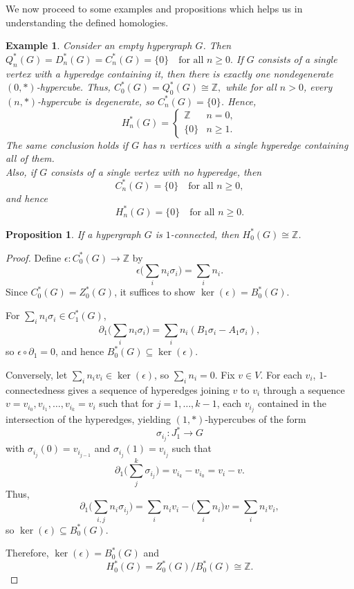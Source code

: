 \documentclass[11pt]{amsart}
\newtheorem{ex}[subsection]{Example}
\newtheorem{prop}[subsection]{Proposition}
\begin{document}
We now proceed to some examples and propositions which helps us in understanding the defined homologies.


\begin{ex}\label{eg single point hom} Consider an empty hypergraph $G$. Then 
$
Q_n^*(G)=D_n^*(G)=C_n^*(G)=\{0\} \quad \text{for all } n \geq 0.
$
If $G$ consists of a single vertex with a hyperedge containing it, then there is exactly one nondegenerate $(0,*)$-hypercube. Thus,
$
C_0^*(G)=Q_0^*(G)\cong \mathbb{Z},
$
while for all $n>0$, every $(n,*)$-hypercube is degenerate, so $C_n^*(G)=\{0\}$. Hence,
\[
H_n^*(G)=
\begin{cases}
\mathbb{Z} & n=0,\\
\{0\} & n \geq 1.
\end{cases}
\]
The same conclusion holds if $G$ has $n$ vertices with a single hyperedge containing all of them.
\\
Also, if $G$ consists of a single vertex with no hyperedge, then 
\[
C_n^*(G)=\{0\} \quad \text{for all } n \geq 0,
\]
and hence 
\[
H_n^*(G)=\{0\} \quad \text{for all } n \geq 0.
\]
\end{ex}


\begin{prop}\label{prop 1-connected}
	If a hypergraph $G$ is $1$-connected, then $H_0^*(G)\cong \mathbb{Z}$.
\end{prop}

\begin{proof}
Define $\epsilon:C_0^*(G)\to \mathbb{Z}$ by
\[
\epsilon\Big(\sum_i n_i \sigma_i\Big)=\sum_i n_i.
\]
Since $C_0^*(G)=Z_0^*(G)$, it suffices to show $\ker(\epsilon)=B_0^*(G)$.

For $\sum_i n_i \sigma_i \in C_1^*(G)$,
\[
\partial_1\Big(\sum_i n_i \sigma_i\Big)
= \sum_i n_i (B_1\sigma_i - A_1\sigma_i),
\]
so $\epsilon\circ \partial_1=0$, and hence $B_0^*(G)\subseteq \ker(\epsilon)$.

Conversely, let $\sum_i n_i v_i \in \ker(\epsilon)$, so $\sum_i n_i=0$. Fix $v\in V$. For each $v_i$, $1$-connectedness gives a sequence of hyperedges joining $v$ to $v_i$ through a sequence $v=v_{i_0},v_{i_1},\ldots,v_{i_k}=v_i$ such that for $j=1,\ldots,k-1$, each $v_{i_j}$ contained in the intersection of the hyperedges, yielding $(1,*)$-hypercubes of the form \[\sigma_{i_j}:J_1^*\to G\] with $\sigma_{i_j}(0)=v_{i_{j-1}}$ and $\sigma_{i_j}(1)=v_{i_j}$ such that 
\[
\partial_1\Big(\sum_j^k\sigma_{i_j}\Big)=v_{i_k} - v_{i_0}=v_i-v.
\]
Thus,
\[
\partial_1\Big(\sum_{i,j} n_i \sigma_{i_j}\Big)
= \sum_i n_i v_i - \Big(\sum_i n_i\Big)v
= \sum_i n_i v_i,
\]
so $\ker(\epsilon)\subseteq B_0^*(G)$.

Therefore, $\ker(\epsilon)=B_0^*(G)$ and
\[
H_0^*(G)=Z_0^*(G)/B_0^*(G)\cong \mathbb{Z}.
\]
\end{proof}
\end{document}
